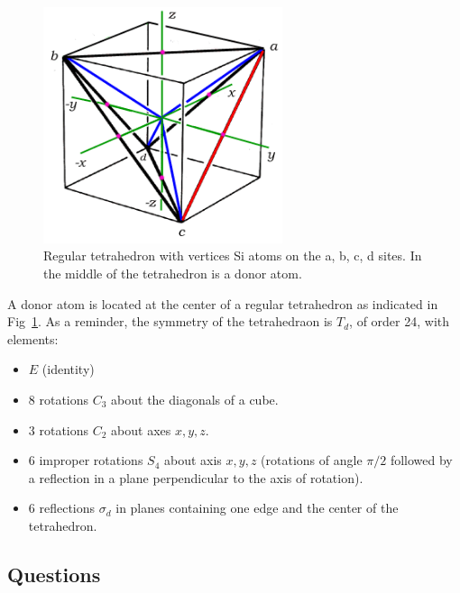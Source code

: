 \begin{figure}[h]
  \centering
  \includegraphics[width=7cm]{xyzcube.png}
  \caption{Regular tetrahedron with vertices Si atoms on the a, b, c,
    d sites. In the middle of the tetrahedron is a donor atom.\label{fig:tetra}}
\end{figure}

A donor atom is located at the center of a regular tetrahedron as
indicated in Fig~\ref{fig:tetra}. As a reminder, the symmetry of the
tetrahedraon is $T_d$, of order 24, with elements:

\begin{itemize}
\item $E$ (identity)
\item 8 rotations  $C_3$ about the diagonals of a cube.
\item 3 rotations $C_2$ about axes $x, y , z$.
\item 6 improper rotations $S_4$ about axis $x, y , z$ (rotations
of angle $\pi/2$ followed by a reflection in a plane perpendicular to
the axis of rotation).
\item 6 reflections $\sigma_d$ in planes containing one edge and the center of
  the tetrahedron.
\end{itemize}

\subsection{Questions}

